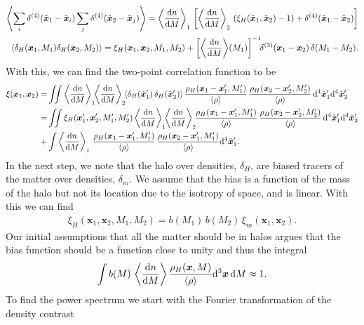 \documentclass[../main.tex]{subfiles}
\begin{document}
\begin{align}
    \left\langle\sum_i \delta^{(4)}(\tilde{\boldsymbol{x}}_1-\tilde{\boldsymbol{x}}_i)\sum_j \delta^{(4)}(\tilde{\boldsymbol{x}}_2-\tilde{\boldsymbol{x}}_j)\right\rangle = \left\langle \frac{\mathrm{d} n}{\mathrm{d} M} \right\rangle_1\,\left[\left\langle \frac{\mathrm{d} n}{\mathrm{d} M} \right\rangle_2\,( \xi_H(\tilde{\boldsymbol{x}}_1,\tilde{\boldsymbol{x}}_2) -1 )+\delta^{(4)}(\tilde{\boldsymbol{x}}_1-\tilde{\boldsymbol{x}}_2)\right] \\
    \langle \delta_H(\boldsymbol{x}_1,M_1) \delta_H(\boldsymbol{x}_2,M_2) \rangle = \xi_H(\boldsymbol{x}_1,\boldsymbol{x}_2,M_1,M_2)+ \left[\left\langle \frac{\mathrm{d} n}{\mathrm{d} M} \right\rangle\!(M_1) \right]^{-1}\!\! \delta^{(3)}(\boldsymbol{x}_1-\boldsymbol{x}_2)\,\delta(M_1-M_2). \label{eq:two-point-halo-seed-density}
\end{align}
With this, we can find the two-point correlation function to be
\begin{align}
    \xi(\boldsymbol{x}_1,\boldsymbol{x}_2) =& \iint \left\langle \frac{\rd n}{\rd M} \right\rangle_1\!\!\left\langle  \frac{\rd n}{\rd M} \right\rangle_2\!\!
    \langle\delta_H(\tilde{\boldsymbol{x}}'_1)\,\delta_H(\tilde{\boldsymbol{x}}'_2)\rangle \,\frac{\rho_H(\boldsymbol{x}_1-\boldsymbol{x}'_1,M_1')}{\langle \rho \rangle} \,\frac{\rho_H(\boldsymbol{x}_2-\boldsymbol{x}'_2,M_2')}{\langle \rho \rangle}\, \rd^4\tilde{\boldsymbol{x}}'_1 \rd^4\tilde{\boldsymbol{x}}'_2 \nonumber\\
    =&\iint \xi_H(\boldsymbol{x}'_1,\boldsymbol{x}'_2,M_1',M_2') \left\langle \frac{\rd n}{\rd M} \right\rangle_1\!\!\left\langle \frac{\rd n}{\rd M} \right\rangle_2 \!\!\frac{\rho_H(\boldsymbol{x}_1-\boldsymbol{x}'_1,M_1')}{\langle \rho \rangle} \,\frac{\rho_H(\boldsymbol{x}_2-\boldsymbol{x}'_2,M_2')}{\langle \rho \rangle}\, \rd^4\tilde{\boldsymbol{x}}'_1 \rd^4\tilde{\boldsymbol{x}}'_2 \nonumber \\
    +&\int \left\langle \frac{\rd n}{\rd M} \right\rangle_1\,\frac{\rho_H(\boldsymbol{x}_1-\boldsymbol{x}'_1,M_1')}{\langle \rho \rangle}\,\frac{\rho_H(\boldsymbol{x}_2-\boldsymbol{x}'_1,M_1')}{\langle \rho \rangle} \rd^4 \tilde{\boldsymbol{x}}_1'.
\end{align}
In the next step, we note that the halo over densities, $\delta_H$, are biased tracers of the matter over densities, $\delta_m$. We assume that the bias is a function of the mass of the halo but not its location due to the isotropy of space, and is linear. With this we can find \begin{align*}
    \xi_H(\boldsymbol{x}_1,\boldsymbol{x}_2,M_1,M_2) = b(M_1)\,b(M_2)\,\xi_m(\boldsymbol{x}_1,\boldsymbol{x}_2). 
\end{align*}
Our initial assumptions that all the matter should be in halos argues that the bias function should be a function close to unity and thus the integral 
\begin{equation}
\int b(M)\,\left\langle\frac{\mathrm{d} n}{\mathrm{d} M}\right\rangle \frac{\rho_H(\boldsymbol{x},M)}{\langle\rho\rangle} \mathrm{d}^3\boldsymbol{x}\,\mathrm{d} M \approx 1. \label{eq:two-halo-integral}
\end{equation}
To find the power spectrum we start with the Fourier transformation of the density contrast 
\end{document}
